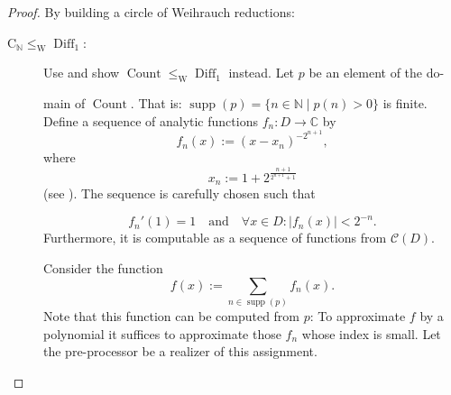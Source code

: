 \documentclass{eptcs-modified}
\newcommand{\leqW}{\leq_{\textrm{W}}}
\newcommand{\CCN}{\mathrm{C}_{\NN}}
\newcommand{\NN}{\mathbb{N}}
\newcommand{\CC}{\mathbb{C}}
\newcommand{\abs}[1]{\left|#1\right|}
\newcommand{\cont}{\mathcal C(D)}
\newcommand{\Count}{\operatorname{Count}}
\newcommand{\Diff}{\operatorname{Diff}}
\newcommand{\supp}{\operatorname{supp}}
\begin{document}
			\begin{proof}
				By building a circle of Weihrauch reductions:
				\begin{description}
					\item[$\CCN\leqW\Diff_1$:]
						Use  and show $\Count\leqW\Diff_1$ instead.
						Let $p$ be an element of the do- \quad

						\noindent\begin{minipage}{.6\textwidth}
main of $\Count$.
							That is: $\supp(p)=\{n\in\NN\mid p(n)>0\}$ is finite.
							Define a sequence of analytic functions $f_n:D\to \CC$ by
							\[ f_n(x) :=\left(x-x_n\right)^{-2^{n+1}},\]
							where
							\[ x_n:=1+2^{\frac{n+1}{2^{n+1}+1}} \]
							(see ). The sequence is carefully chosen such that
						\end{minipage}\hspace{.25cm}
						\begin{minipage}{.3\textwidth}
							\vspace{-.1cm}
							\label{fig:the functions fn}
						\end{minipage}
						\[ f_n'(1) = 1\quad\text{and}\quad \forall x\in D: \abs{f_n(x)}<2^{-n}. \]
						Furthermore, it is computable as a sequence of functions from $\cont$.

						Consider the function
						\[ f(x) := \sum_{n\in\supp(p)} f_n(x). \]
						Note that this function can be computed from $p$: To approximate $f$ by a polynomial it suffices to approximate those $f_n$ whose index is small.
						Let the pre-processor be a realizer of this assignment.


\end{description}
\end{proof}
\end{document}
